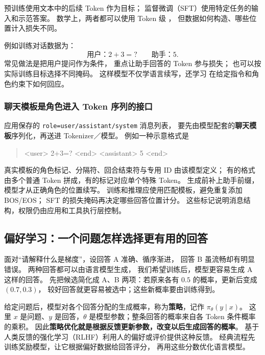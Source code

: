 预训练使用文本中的后续 Token 作为目标；
监督微调（SFT）使用特定任务的输入和示范答案。
数学上，两者都可以使用 Token 级 ，
但数据如何构造、哪些位置计入损失不同。

例如训练对话数据为：
\[
\text{用户：$2+3=?$}\qquad
\text{助手：$5$}.
\]
常见做法是把用户提问作为条件，
重点让助手回答的 Token 参与损失；
也可以按实际训练目标选择不同掩码。
这样模型不仅学语言续写，还学习
在给定指令和角色约束下如何回应。

\subsubsection*{聊天模板是角色进入 Token 序列的接口}
\label{concept:chat-template}
应用保存的 \texttt{role=user/assistant/system} 消息列表，
要先由模型配套的\textbf{聊天模板}序列化，再送进 Tokenizer／模型。
例如一种示意格式是
\begin{quote}\ttfamily\small
<user> 2+3=? <end> <assistant> 5 <end>
\end{quote}
真实模板的角色标记、分隔符、回合结束符与专用 ID 由该模型定义；
有的格式由多个普通 Token 拼成，有的标记对应单个特殊 Token。
生成前补上助手前缀，模型才从正确角色的位置续写。
训练和推理应使用匹配模板，避免重复添加 BOS/EOS；
SFT 的损失掩码再决定哪些回答位置计分。
这些标记说明消息结构，权限仍由应用和工具执行层控制。



\subsection{偏好学习：一个问题怎样选择更有用的回答}
\label{concept:rlhf}

面对“请解释什么是梯度”，设回答 A 准确、循序渐进，
回答 B 虽流畅却有明显错误。
两种回答都可以由语言模型生成，
我们希望训练后，模型更容易生成 A 这样的回答。
先把候选简化成 A、B 两项：若原来各有 $0.5$ 的概率，更新后变成 $(0.7,0.3)$，
较好回答就更容易被选中；这些新概率要由训练得到。

给定问题后，模型对各个回答分配的生成概率，称为\textbf{策略}，记作 $\pi_\theta(y\mid x)$。
这里 $x$ 是问题、$y$ 是回答，$\theta$ 是模型参数；整条回答的概率来自各 Token 条件概率的乘积。
因此\textbf{策略优化就是根据反馈更新参数，改变以后生成回答的概率}。
基于人类反馈的强化学习（RLHF）利用人的偏好或评价提供这种反馈。
经典流程先训练\label{concept:reward-model}奖励模型，让它根据偏好数据给回答评分，
再用这些分数优化语言模型。

